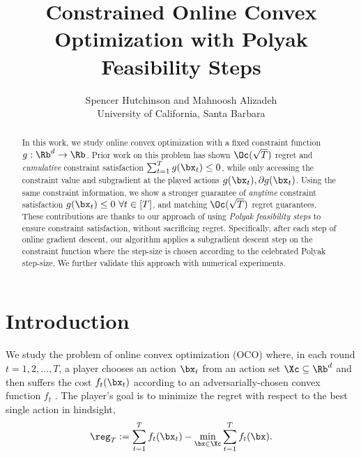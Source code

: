 

\title{Constrained Online Convex Optimization with Polyak Feasibility Steps}
\date{}
\author{Spencer Hutchinson and Mahnoosh Alizadeh\\
\small University of California, Santa Barbara}

 \maketitle


 \begin{abstract}
    In this work, we study online convex optimization with a fixed constraint function $g : \Rb^d \rightarrow \Rb$.
    Prior work on this problem has shown $\Oc(\sqrt{T})$ regret and \emph{cumulative} constraint satisfaction $\sum_{t=1}^{T} g(\bx_t) \leq 0$, while only accessing the constraint value and subgradient at the played actions $g(\bx_t), \partial g(\bx_t)$.
    Using the same constraint information, we show a stronger guarantee of \emph{anytime} constraint satisfaction $g(\bx_t) \leq 0 \ \forall t \in [T]$, and matching $\Oc(\sqrt{T})$ regret guarantees.
    These contributions are thanks to our approach of using \emph{Polyak feasibility steps} to ensure constraint satisfaction, without sacrificing regret.
    Specifically, after each step of online gradient descent, our algorithm applies a subgradient descent step on the constraint function where the step-size is chosen according to the celebrated Polyak step-size.
    We further validate this approach with numerical experiments.
\end{abstract}

\section{Introduction}

We study the problem of online convex optimization (OCO) where, in each round $t = 1,2,...,T$, a player chooses an action $\bx_t$ from an action set $\Xc \subseteq \Rb^d$ and then suffers the cost $f_t(\bx_t)$ according to an adversarially-chosen convex function $f_t$ \citep{zinkevich2003online}.
The player's goal is to minimize the regret with respect to the best single action in hindsight,
\begin{equation*}
    \reg_T := \sum_{t=1}^{T} f_t (\bx_t) - \min_{\bx \in \Xc}\sum_{t=1}^{T} f_t (\bx).
\end{equation*}

